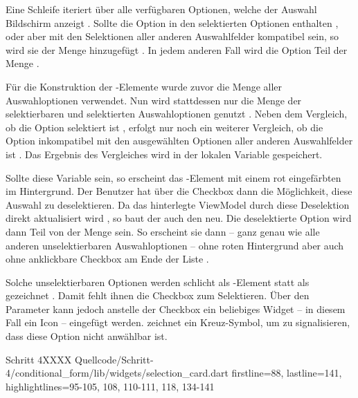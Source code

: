 Eine Schleife iteriert über alle verfügbaren Optionen, welche der Auswahl Bildschirm anzeigt  .
Sollte die Option in den selektierten Optionen enthalten ,
oder aber mit den Selektionen aller anderen Auswahlfelder kompatibel sein,
so wird sie der Menge  hinzugefügt .
In jedem anderen Fall wird die Option Teil der Menge  .

Für die Konstruktion der -Elemente wurde zuvor die Menge aller Auswahloptionen verwendet.
Nun wird stattdessen nur die Menge der selektierbaren und selektierten Auswahloptionen genutzt .
Neben dem Vergleich,
ob die Option selektiert ist ,
erfolgt nur noch ein weiterer Vergleich,
ob die Option inkompatibel mit den ausgewählten Optionen aller anderen Auswahlfelder ist .
Das Ergebnis des Vergleiches wird in der lokalen Variable  gespeichert.

Sollte diese Variable  sein,
so erscheint das -Element mit einem rot eingefärbten im Hintergrund.
Der Benutzer hat über die Checkbox dann die Möglichkeit,
diese Auswahl zu deselektieren.
Da das hinterlegte ViewModel durch diese Deselektion direkt aktualisiert wird ,
so baut der  auch den  neu.
Die deselektierte Option wird dann Teil von der Menge   sein.
So erscheint sie dann
-- ganz genau wie alle anderen unselektierbaren Auswahloptionen --
ohne roten Hintergrund aber auch ohne anklickbare Checkbox am Ende der Liste .

Solche unselektierbaren Optionen werden schlicht als -Element statt als  gezeichnet .
Damit fehlt ihnen die Checkbox zum Selektieren.
Über den Parameter  kann jedoch anstelle der Checkbox ein beliebiges Widget
-- in diesem Fall ein Icon --
eingefügt werden.
 zeichnet ein Kreuz-Symbol,
um zu signalisieren,
dass diese Option nicht anwählbar ist. 


\begin{alexlisting}{Schritt 4}{XXXX}
  {Quellcode/Schritt-4/conditional_form/lib/widgets/selection_card.dart}
  {firstline=88, lastline=141, highlightlines={95-105, 108, 110-111, 118, 134-141}}
  \label{lst:Schritt4selectedAndSelectableChoices}
\end{alexlisting}

\ifIncludeFigures \clearpage \fi

